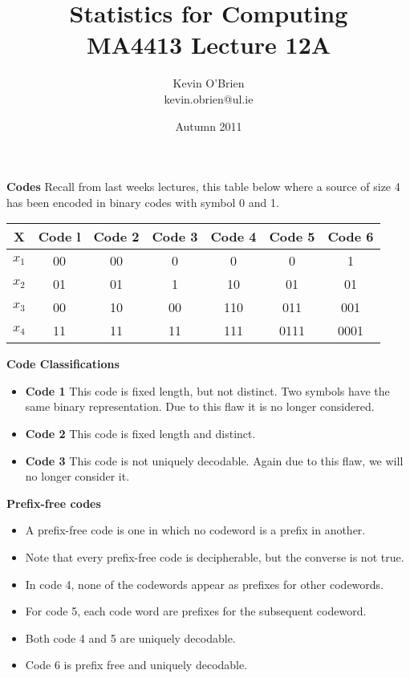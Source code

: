 \documentclass[a4]{beamer}
\title[MA4413]{Statistics for Computing \\ {\normalsize MA4413 Lecture 12A}}
\author[Kevin O'Brien]{Kevin O'Brien \\ {\scriptsize kevin.obrien@ul.ie}}
\date{Autumn 2011}
\institute[Maths \& Stats]{Dept. of Mathematics \& Statistics, \\ University \textit{of} Limerick}
\begin{document}
\medskip
\titlepage

\medskip
\noindent \textbf{Codes}
Recall from last weeks lectures, this table below where a source of
size 4 has been encoded in binary codes with symbol 0 and 1.\\ \bigskip
\begin{center}
\begin{tabular}{|c| c| c| c| c| c| c|}
\hline
X& Code l& Code 2& Code 3 &Code 4& Code 5& Code 6\\\hline
$x_1$& 00& 00 &0 &0 &0 &1\\
$x_2$& 01& 01 &1 &10 &01 &01\\
$x_3$ &00 &10& 00& 110& 011 &001\\
$x_4$ &11& 11& 11& 111 &0111 &0001\\\hline
\end{tabular}
\end{center}


\medskip
\noindent \textbf{Code Classifications}
\begin{itemize}
\item \textbf{Code 1} This code is fixed length, but not distinct. Two symbols have the same binary representation. Due to this flaw it is no longer considered.
\item \textbf{Code 2} This code is fixed length and distinct. 
\item \textbf{Code 3} This code is not uniquely decodable. Again due to this flaw, we will no longer consider it.

\end{itemize}

\medskip
\noindent \textbf{Prefix-free codes}
\begin{itemize}
\item A prefix-free code is one in which no codeword is a prefix in another. \item Note that every prefix-free code is decipherable, but the converse is not true. 
    \item In code 4, none of the codewords appear as prefixes for other codewords.
\item For code 5, each code word are prefixes for the subsequent codeword.
\item Both code 4 and 5 are uniquely decodable.
\item Code 6 is prefix free and uniquely decodable.
\end{itemize}
\end{document}
